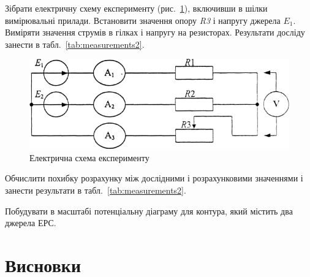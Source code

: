 \documentclass[a4paper,oneside,DIV=10,12pt]{scrartcl}
\newcommand\schel[1]{\textit{#1}}
\begin{document}
		Зібрати електричну схему експерименту (рис.~\ref{fig:schematic02}), включивши в шілки вимірювальні прилади. Встановити значення опору \schel{R3} і напругу джерела \schel{$E_1$}. Виміряти значення струмів в гілках і напругу на резисторах. Результати досліду занести в табл.~\ref{tab:measurements2}.
		
		\begin{figure}[!htbp]
			\centering
			\includegraphics[width=\textwidth]{schematic-02.png}
			\caption{Електрична схема експерименту}
			\label{fig:schematic02}
		\end{figure}
		
		Обчислити похибку розрахунку між дослідними і розрахунковими значеннями і занести результати в табл.~\ref{tab:measurements2}.
		
		Побудувати в масштабі потенціальну діаграму для контура, який містить два джерела ЕРС.
		
	\section{Висновки}
		
\end{document}
